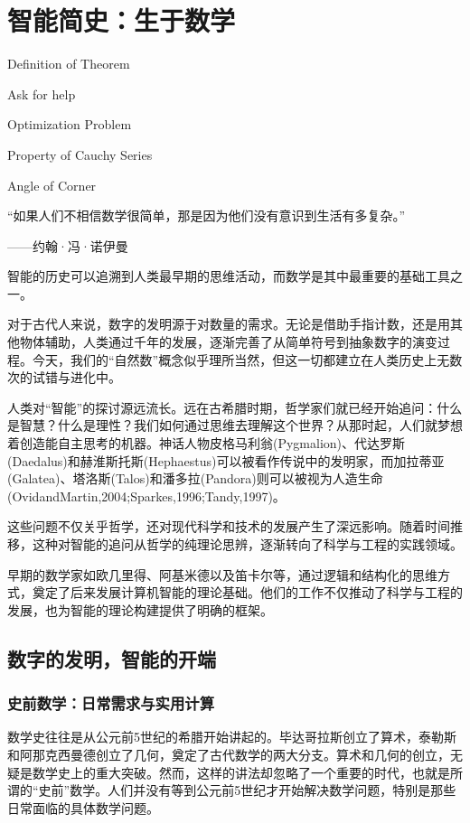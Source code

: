 \chapter{智能简史：生于数学}

\begin{introduction}
\item Definition of Theorem
\item Ask for help
\item Optimization Problem
\item Property of Cauchy Series
\item Angle of Corner
\end{introduction}

“如果人们不相信数学很简单，那是因为他们没有意识到生活有多复杂。”
\begin{flushright}
------约翰·冯·诺伊曼
\end{flushright}


智能的历史可以追溯到人类最早期的思维活动，而数学是其中最重要的基础工具之一。

对于古代人来说，数字的发明源于对数量的需求。无论是借助手指计数，还是用其他物体辅助，人类通过千年的发展，逐渐完善了从简单符号到抽象数字的演变过程。今天，我们的“自然数”概念似乎理所当然，但这一切都建立在人类历史上无数次的试错与进化中。

人类对“智能”的探讨源远流长。远在古希腊时期，哲学家们就已经开始追问：什么是智慧？什么是理性？我们如何通过思维去理解这个世界？从那时起，人们就梦想着创造能自主思考的机器。神话人物皮格马利翁(Pygmalion)、代达罗斯(Daedalus)和赫淮斯托斯(Hephaestus)可以被看作传说中的发明家，而加拉蒂亚(Galatea)、塔洛斯(Talos)和潘多拉(Pandora)则可以被视为人造生命(OvidandMartin,2004;Sparkes,1996;Tandy,1997)。

这些问题不仅关乎哲学，还对现代科学和技术的发展产生了深远影响。随着时间推移，这种对智能的追问从哲学的纯理论思辨，逐渐转向了科学与工程的实践领域。

早期的数学家如欧几里得、阿基米德以及笛卡尔等，通过逻辑和结构化的思维方式，奠定了后来发展计算机智能的理论基础。他们的工作不仅推动了科学与工程的发展，也为智能的理论构建提供了明确的框架。

\section{数字的发明，智能的开端}

\subsection{史前数学：日常需求与实用计算}
数学史往往是从公元前5世纪的希腊开始讲起的。毕达哥拉斯创立了算术，泰勒斯和阿那克西曼德创立了几何，奠定了古代数学的两大分支。算术和几何的创立，无疑是数学史上的重大突破。然而，这样的讲法却忽略了一个重要的时代，也就是所谓的“史前”数学。人们并没有等到公元前5世纪才开始解决数学问题，特别是那些日常面临的具体数学问题。

